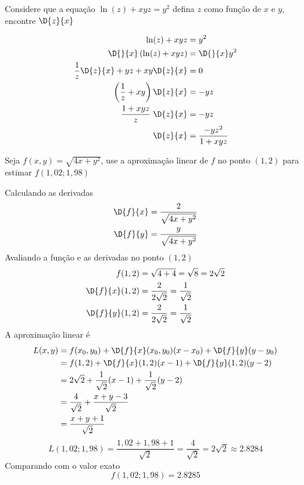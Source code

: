 \documentclass[a4paper,12pt,fleqn]{article}
\begin{document}

Considere que a equação
\(
  \ln(z) + xyz = y^2
\)
defina $z$ como função de $x$ e $y$, encontre \(\D{z}{x}\)
\clearpagequestiononly

\begin{answer}
  \begin{align*}
    \ln(z) + xyz                             & = y^2                   \\
    \D{}{x} \left( \ln(z) + xyz \right)      & = \D{}{x}y^2            \\
    \frac{1}{z} \D{z}{x} + yz + xy \D{z}{x}  & = 0                     \\
    \left( \frac{1}{z} + xy \right) \D{z}{x} & = -yz                   \\
    \frac{1+ xyz}{z} \; \D{z}{x}             & = -yz                   \\
    \D{z}{x}                                 & = \frac{-yz^2}{1 + xyz}
  \end{align*}
\end{answer}

Seja \( f(x, y) = \sqrt{4x + y^2} \),
use a aproximação linear de $f$ no ponto $(1, 2)$
para estimar $f(1,02; 1,98)$
\clearpagequestiononly

\begin{answer}
  Calculando as derivadas
  \begin{align*}
    \D{f}{x} & = \frac{2}{\sqrt{4x + y^2}} \\
    \D{f}{y} & = \frac{y}{\sqrt{4x + y^2}}
  \end{align*}
  Avaliando a função e as derivadas no ponto $(1, 2)$
  \begin{align*}
    f(1, 2)        & = \sqrt{4 + 4} = \sqrt{8} = 2\sqrt{2}      \\
    \D{f}{x}(1, 2) & = \frac{2}{2\sqrt{2}} = \frac{1}{\sqrt{2}} \\
    \D{f}{y}(1, 2) & = \frac{2}{2\sqrt{2}} = \frac{1}{\sqrt{2}}
  \end{align*}
  A aproximação linear é
  \begin{align*}
    L(x, y) & = f(x_0, y_0) + \D{f}{x}(x_0, y_0)(x-x_0) + \D{f}{y}(y-y_0) \\
            & = f(1, 2) + \D{f}{x}(1, 2)(x - 1) + \D{f}{y}(1, 2)(y - 2)   \\
            & = 2\sqrt{2} + \frac{1}{\sqrt{2}}(x - 1) + \frac{1}{\sqrt{2}}(y - 2) \\
            & = \frac{4}{\sqrt{2}} + \frac{x + y - 3}{\sqrt{2}} \\
            & = \frac{x + y + 1}{\sqrt{2}}
  \end{align*}
  \[
    L(1,02; 1,98) = \frac{1,02 + 1,98 + 1}{\sqrt{2}}
                  = \frac{4}{\sqrt{2}}
                  = 2\sqrt{2}
                  \approx 2.8284
  \]
  Comparando com o valor exato
  \[
    f(1,02; 1,98) = 2.8285
  \]
\end{answer}
\end{document}
